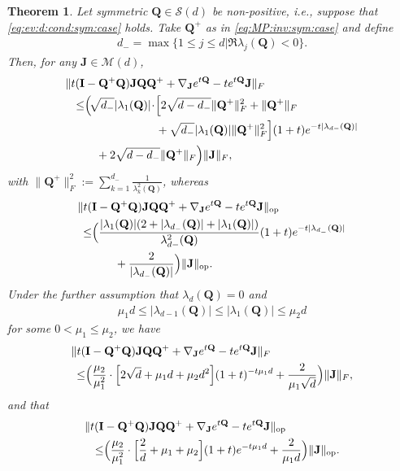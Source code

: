 \documentclass[9pt,twocolumn,twoside]{pnas-new}
\newcommand{\?}{\textbf{?}}
\newcommand{\op}{\textnormal{op}}
\newcommand{\QQ}{\mathbf{Q}}
\newcommand{\JJ}{\mathbf{J}}
\newcommand{\II}{\mathbf{I}}
\newtheorem{theorem}{\bf Theorem}
\begin{document}
\begin{theorem}\label{thm:bride:of:frankinstein}
  Let symmetric $\QQ \in \mathcal{S}(d)$ be non-positive, i.e.,  suppose that
  \eqref{eq:ev:d:cond:sym:case} holds.  Take $\QQ^+$ as in
  \eqref{eq:MP:inv:sym:case} and define
    \begin{align}\label{eq:first:neg}
      d_{-} = \max\{ 1 \leq j \leq d | \Re \lambda_{j}(\QQ) < 0\}.
    \end{align}
    Then, for any $\JJ \in \mathcal{M}(d)$,
  \begin{align}
      \| t(\II&  -\QQ^+  \QQ) \JJ \QQ \QQ^{+}
                +  \nabla_\JJ e^{t \QQ} - t  e^{t\QQ} \JJ\|_{F} 
                \label{eq:bride:of:frankinstein:1}\\
    \leq&  
    \Big( \! \sqrt{d_{-}}|\lambda_1(\QQ)| \! \cdot\!  \Big[ 2 \sqrt{d-d_{-}} \| \QQ^+\|_F^2 +  \| \QQ^+\|_F
    \notag \\ 
              &\qquad \qquad \qquad \;
    + \sqrt{d_{-}}|\lambda_1(\QQ)|\| \QQ^+\|_F^2 \Big]   (1+t)e^{- t|\lambda_{d-}(\QQ)|}
   \notag \\ 
&\quad+  2\sqrt{d - d_{-}} \| \QQ^+\|_F  \Big)\|\JJ\|_{F},  \notag
  \end{align}
  with $\| \QQ^+\|_F^2 := \sum^{d_-}_{k=1}\frac{1}{\lambda^2_{k}(\QQ)}$, whereas
  \begin{align}
    \| t(&\II -\QQ^+ \QQ) \JJ \QQ \QQ^{+}
         +  \nabla_\JJ e^{t \QQ} - t  e^{t\QQ} \JJ\|_{\op}
         \label{eq:bride:of:frankinstein}\\
    \leq &
           \Big(
           \frac{|\lambda_1(\QQ)|(2 + |\lambda_{d_-}(\QQ)|  + |\lambda_1(\QQ)|)}{\lambda^2_{d-}(\QQ)} 
           (1+t) e^{-t |\lambda_{d_-}(\QQ)|}
           \notag
    \\ 
              &\qquad+ \frac{2}{|\lambda_{d_{-}}(\QQ)|}\Big) \|\JJ\|_{\op}.
                \notag
  \end{align}
  Under the further assumption that $\lambda_{d}(\QQ) = 0$
  and
  \begin{align}
    \mu_1 d \leq |\lambda_{d-1}(\QQ)|
    \leq |\lambda_{1}(\QQ)| \leq \mu_2 d
  \end{align}
  for some $0< \mu_1\leq \mu_2$, we have
    \begin{align}\label{eq:bride:of:frankinstein:1:rm:app}
    \| t(&\II  -\QQ^+ \QQ) \JJ \QQ \QQ^{+}
         +  \nabla_\JJ e^{t \QQ} - t  e^{t\QQ} \JJ\|_{F}
         \\
     \leq &    \Big(\frac{\mu_2}{\mu_1^2}  \cdot \Big[ 2 \sqrt{d} + \mu_1 d  
            +  \mu_2 d^2\Big](1+t)^{-t \mu_1 d} +  \frac{2}{\mu_1 \sqrt{d}} \Big) \|\JJ\|_{F},
            \notag
  \end{align}
  and that
    \begin{align}\label{eq:bride:of:frankinstein:0:rm:app}
    \| t(\II & -\QQ^+ \QQ) \JJ \QQ \QQ^{+}
         +  \nabla_\JJ e^{t \QQ} - t  e^{t\QQ} \JJ\|_{\op}\\
      \leq &  \Big( \frac{\mu_2}{\mu^2_1}\cdot\Big[   \frac{2}{d} + \mu_1  +\mu_2\Big]
             (1+t)e^{-t \mu_1 d} + \frac{2}{\mu_1 d}\Big)
            \|\JJ\|_{\op}.\notag
  \end{align}
\end{theorem}
\end{document}

